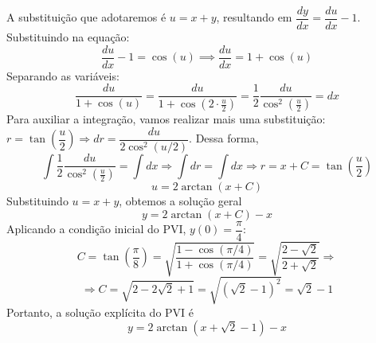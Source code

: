 \documentclass[oneside,12pt,a4paper]{report}
\begin{document}
\begin{resolucao}
        \itemresolucao A substituição que adotaremos é $u=x+y$, resultando em $\dfrac{dy}{dx}=\dfrac{du}{dx}-1$.
        Substituindo na equação:
        \[\frac{du}{dx}-1=\cos(u) \implies \frac{du}{dx}=1+\cos(u)\]
        Separando as variáveis:
        \[\frac{du}{1+\cos(u)}=\frac{du}{1+\cos(2\cdot\frac{u}{2})}=\frac{1}{2}\frac{du}{\cos^2(\frac{u}{2})}=dx\]
        Para auxiliar a integração, vamos realizar mais uma substituição: $r=\tan\left(\dfrac{u}{2}\right)\Rightarrow dr=\dfrac{du}{2\cos^2(u/2)}$. Dessa forma,
        \[\int\frac{1}{2}\frac{du}{\cos^2(\frac{u}{2})}=\int dx\Rightarrow \int dr=\int dx\Rightarrow r=x+C=\tan\left(\frac{u}{2}\right)\]
        \[u=2\arctan(x+C)\]
        Substituindo $u=x+y$, obtemos a solução geral \[y=2\arctan(x+C)-x\]
        Aplicando a condição inicial do PVI, $y(0)=\dfrac{\pi}{4}$:
        \[C=\tan\left(\frac{\pi}{8}\right)=\sqrt{\frac{1-\cos(\pi/4)}{1+\cos(\pi/4)}}=\sqrt{\frac{2-\sqrt{2}}{2+\sqrt{2}}}\Rightarrow\]
        \[\Rightarrow C=\sqrt{2-2\sqrt{2}+1}=\sqrt{(\sqrt{2}-1)^2}=\sqrt{2}-1\]
        Portanto, a solução explícita do PVI é
        \[\boxed{y=2\arctan(x+\sqrt{2}-1)-x}\]
    \end{resolucao}
\end{document}
